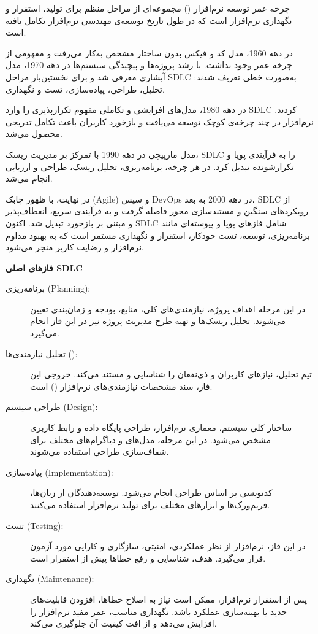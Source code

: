 چرخه عمر توسعه نرم‌افزار () مجموعه‌ای از مراحل منظم برای تولید، استقرار و نگهداری نرم‌افزار است که در طول تاریخ توسعه‌ی مهندسی نرم‌افزار تکامل یافته است.\cite{SDLC}

در دهه 1960، مدل کد و فیکس بدون ساختار مشخص به‌کار می‌رفت و مفهومی از چرخه عمر وجود نداشت. با رشد پروژه‌ها و پیچیدگی سیستم‌ها در دهه 1970، مدل آبشاری معرفی شد و برای نخستین‌بار مراحل SDLC به‌صورت خطی تعریف شدند: تحلیل، طراحی، پیاده‌سازی، تست و نگهداری.\cite{SDLC}

در دهه 1980، مدل‌های افزایشی و تکاملی مفهوم تکرارپذیری را وارد SDLC کردند. نرم‌افزار در چند چرخه‌ی کوچک توسعه می‌یافت و بازخورد کاربران باعث تکامل تدریجی محصول می‌شد.\cite{SDLC}

مدل مارپیچی در دهه 1990 با تمرکز بر مدیریت ریسک، SDLC را به فرآیندی پویا و تکرارشونده تبدیل کرد. در هر چرخه، برنامه‌ریزی، تحلیل ریسک، طراحی و ارزیابی انجام می‌شد.\cite{SDLC}

در نهایت، با ظهور چابک (Agile) و سپس DevOps در دهه 2000 به بعد، SDLC از رویکردهای سنگین و مستندسازی محور فاصله گرفت و به فرآیندی سریع، انعطاف‌پذیر و مبتنی بر بازخورد تبدیل شد. اکنون SDLC شامل فازهای پویا و پیوسته‌ای مانند برنامه‌ریزی، توسعه، تست خودکار، استقرار و نگهداری مستمر است که به بهبود مداوم نرم‌افزار و رضایت کاربر منجر می‌شود.\cite{SDLC}

\noindent \textbf{فازهای اصلی SDLC}


\begin{description}
  \item[برنامه‌ریزی (Planning):] در این مرحله اهداف پروژه، نیازمندی‌های کلی، منابع، بودجه و زمان‌بندی تعیین می‌شوند. تحلیل ریسک‌ها و تهیه طرح مدیریت پروژه نیز در این فاز انجام می‌گیرد.\cite{SDLC}

  \item[تحلیل نیازمندی‌ها ():] تیم تحلیل، نیازهای کاربران و ذی‌نفعان را شناسایی و مستند می‌کند. خروجی این فاز، سند مشخصات نیازمندی‌های نرم‌افزار () است.\cite{SDLC}

  \item[طراحی سیستم (Design):] ساختار کلی سیستم، معماری نرم‌افزار، طراحی پایگاه داده و رابط کاربری مشخص می‌شود. در این مرحله، مدل‌های  و دیاگرام‌های مختلف برای شفاف‌سازی طراحی استفاده می‌شوند.\cite{SDLC}

  \item[پیاده‌سازی (Implementation):] کدنویسی بر اساس طراحی انجام می‌شود. توسعه‌دهندگان از زبان‌ها، فریم‌ورک‌ها و ابزارهای مختلف برای تولید نرم‌افزار استفاده می‌کنند.\cite{SDLC}

  \item[تست (Testing):] در این فاز، نرم‌افزار از نظر عملکردی، امنیتی، سازگاری و کارایی مورد آزمون قرار می‌گیرد. هدف، شناسایی و رفع خطاها پیش از استقرار است.\cite{SDLC}

  \item[نگهداری (Maintenance):] پس از استقرار نرم‌افزار، ممکن است نیاز به اصلاح خطاها، افزودن قابلیت‌های جدید یا بهینه‌سازی عملکرد باشد. نگهداری مناسب، عمر مفید نرم‌افزار را افزایش می‌دهد و از افت کیفیت آن جلوگیری می‌کند.\cite{SDLC}
\end{description}